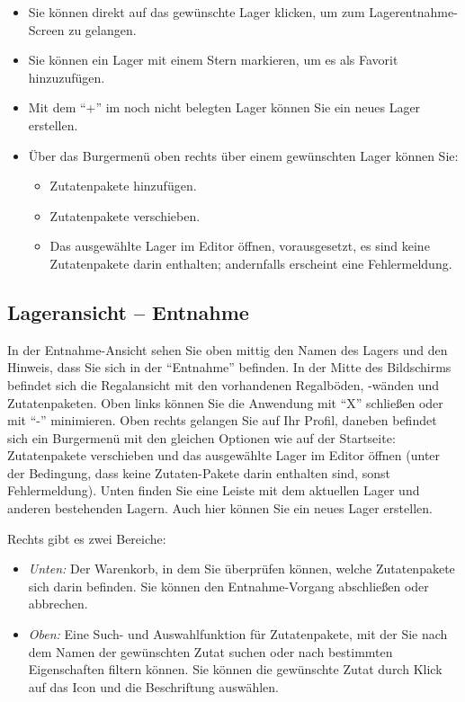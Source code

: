 \begin{itemize}
	\item Sie können direkt auf das gewünschte Lager klicken, um zum Lagerentnahme-Screen zu gelangen.
	\item Sie können ein Lager mit einem Stern markieren, um es als Favorit hinzuzufügen.
	\item Mit dem ``+'' im noch nicht belegten Lager können Sie ein neues Lager erstellen.
	\item Über das Burgermenü oben rechts über einem gewünschten Lager können Sie:
	\begin{itemize}
		\item Zutatenpakete hinzufügen.
		\item Zutatenpakete verschieben.
		\item Das ausgewählte Lager im Editor öffnen, vorausgesetzt, es sind keine Zutatenpakete darin enthalten; andernfalls erscheint eine Fehlermeldung.
	\end{itemize}
\end{itemize}

\subsection{Lageransicht – Entnahme}
In der Entnahme-Ansicht sehen Sie oben mittig den Namen des Lagers und den Hinweis, dass Sie sich in der ``Entnahme''
befinden. In der Mitte des Bildschirms befindet sich die Regalansicht mit den vorhandenen Regalböden, -wänden und
Zutatenpaketen. Oben links können Sie die Anwendung mit ``X'' schließen oder mit ``-'' minimieren. Oben rechts
gelangen Sie auf Ihr Profil, daneben befindet sich ein Burgermenü mit den gleichen Optionen wie auf der Startseite:
Zutatenpakete verschieben und das ausgewählte Lager im Editor öffnen (unter der Bedingung, dass keine Zutaten-Pakete
darin enthalten sind, sonst Fehlermeldung). Unten finden Sie eine Leiste mit dem aktuellen Lager und anderen
bestehenden Lagern. Auch hier können Sie ein neues Lager erstellen.

Rechts gibt es zwei Bereiche:
\begin{itemize}
	\item \textit{Unten:} Der Warenkorb, in dem Sie überprüfen können, welche Zutatenpakete sich darin befinden. Sie können den Entnahme-Vorgang abschließen oder abbrechen.
	\item \textit{Oben:} Eine Such- und Auswahlfunktion für Zutatenpakete, mit der Sie nach dem Namen der gewünschten Zutat suchen oder nach bestimmten Eigenschaften filtern können. Sie können die gewünschte Zutat durch Klick auf das Icon und die Beschriftung auswählen.
\end{itemize}

